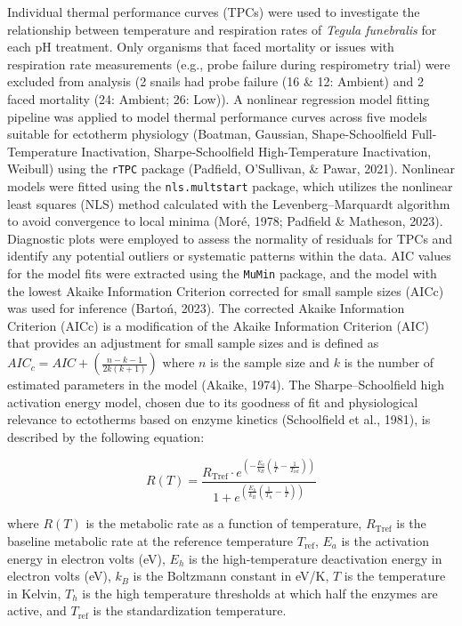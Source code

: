 \documentclass{CSUNthesis}
\begin{document}
Individual thermal performance curves (TPCs) were used to investigate the relationship between temperature and respiration rates of \textit{Tegula funebralis} for each pH treatment. Only organisms that faced mortality or issues with respiration rate measurements (e.g., probe failure during respirometry trial) were excluded from analysis (2 snails had probe failure (16 \& 12: Ambient) and 2 faced mortality (24: Ambient; 26: Low)). A nonlinear regression model fitting pipeline was applied to model thermal performance curves across five models suitable for ectotherm physiology (Boatman, Gaussian, Shape-Schoolfield Full-Temperature Inactivation, Sharpe-Schoolfield High-Temperature Inactivation, Weibull) using the \texttt{rTPC} package (Padfield, O'Sullivan, \& Pawar, 2021). Nonlinear models were fitted using the \texttt{nls.multstart} package, which utilizes the nonlinear least squares (NLS) method calculated with the Levenberg--Marquardt algorithm to avoid convergence to local minima (Moré, 1978; Padfield \& Matheson, 2023). Diagnostic plots were employed to assess the normality of residuals for TPCs and identify any potential outliers or systematic patterns within the data. AIC values for the model fits were extracted using the \texttt{MuMin} package, and the model with the lowest Akaike Information Criterion corrected for small sample sizes (AICc) was used for inference (Bartoń, 2023). The corrected Akaike Information Criterion (AICc) is a modification of the Akaike Information Criterion (AIC) that provides an adjustment for small sample sizes and is defined as \(AIC_c = AIC + \left( \frac{n - k - 1}{2k(k+1)} \right)\) where \(n\) is the sample size and \(k\) is the number of estimated parameters in the model (Akaike, 1974). The Sharpe--Schoolfield high activation energy model, chosen due to its goodness of fit and physiological relevance to ectotherms based on enzyme kinetics (Schoolfield et al., 1981), is described by the following equation:

\begin{equation}
R(T) = \frac{R_{\text{Tref}} \cdot e^{\left( -\frac{E_a}{k_B} \left( \frac{1}{T} - \frac{1}{T_{\text{ref}}} \right) \right)}}{1 + e^{\left( \frac{E_h}{k_B} \left( \frac{1}{T_h} - \frac{1}{T} \right) \right)}}
\label{eq:sharpe_schoolfield}
\end{equation}

where \(R(T)\) is the metabolic rate as a function of temperature, \(R_{\text{Tref}}\) is the baseline metabolic rate at the reference temperature \(T_{\text{ref}}\), \(E_a\) is the activation energy in electron volts (eV), \(E_h\) is the high-temperature deactivation energy in electron volts (eV), \(k_B\) is the Boltzmann constant in eV/K, \(T\) is the temperature in Kelvin, \(T_h\) is the high temperature thresholds at which half the enzymes are active, and \(T_{\text{ref}}\) is the standardization temperature.
\end{document}
